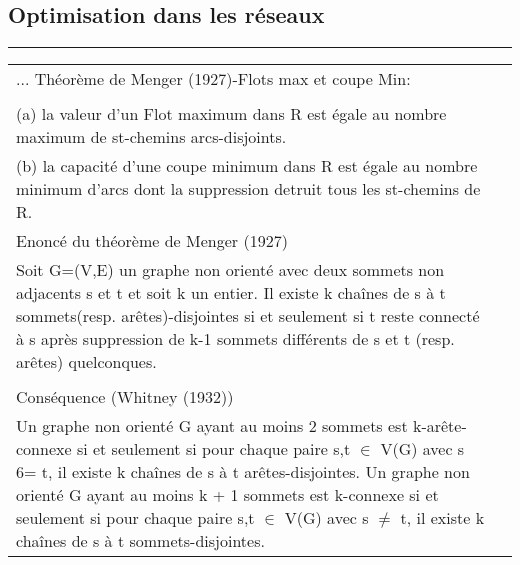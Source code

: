 \documentclass[5pt]{article}
\begin{document}
\begin{scriptsize}
\subsection{Optimisation dans les réseaux}
\hrule\noindent
\begin{tiny}
\begin{tabularx}{\linewidth}{|Y|Y|} \hline
...
Théorème de Menger (1927)-Flots max et coupe Min:\\ \\
(a) la valeur d'un Flot maximum dans R est égale au nombre maximum de st-chemins arcs-disjoints. \\
(b) la capacité d'une coupe minimum dans R est égale au nombre minimum d'arcs dont la suppression detruit tous les st-chemins de R.\\ \hline
Enoncé du théorème de Menger (1927) \\
Soit G=(V,E) un graphe non orienté avec deux sommets non adjacents s et t et soit k un entier. Il existe k chaînes de s à t sommets(resp. arêtes)-disjointes si et seulement si t reste connecté à s après suppression de k-1 sommets différents de s et t (resp. arêtes) quelconques.\\ \\
Conséquence (Whitney (1932))\\
Un graphe non orienté G ayant au moins 2 sommets est k-arête-connexe si et seulement si pour chaque paire s,t $\in$ V(G) avec s 6= t, il existe k chaînes de s à t arêtes-disjointes. Un graphe non orienté G ayant au moins k + 1 sommets est k-connexe si et seulement si pour chaque paire s,t $\in$ V(G) avec s $\neq$ t, il existe k chaînes de s à t sommets-disjointes.
\\
\hline \end{tabularx}


\end{tiny}
\end{scriptsize}
\end{document}
